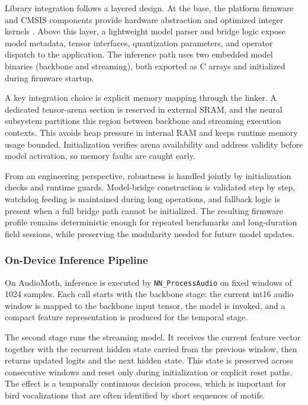 \documentclass[a4paper,singleside,12pt]{report} %
\begin{document}
		Library integration follows a layered design. At the base, the platform firmware and CMSIS components provide hardware abstraction and optimized integer kernels \cite{cmsisnn2018}. Above this layer, a lightweight model parser and bridge logic expose model metadata, tensor interfaces, quantization parameters, and operator dispatch to the application. The inference path uses two embedded model binaries (backbone and streaming), both exported as C arrays and initialized during firmware startup.

	A key integration choice is explicit memory mapping through the linker. A dedicated tensor-arena section is reserved in external SRAM, and the neural subsystem partitions this region between backbone and streaming execution contexts. This avoids heap pressure in internal RAM and keeps runtime memory usage bounded. Initialization verifies arena availability and address validity before model activation, so memory faults are caught early.

	From an engineering perspective, robustness is handled jointly by initialization checks and runtime guards. Model-bridge construction is validated step by step, watchdog feeding is maintained during long operations, and fallback logic is present when a full bridge path cannot be initialized. The resulting firmware profile remains deterministic enough for repeated benchmarks and long-duration field sessions, while preserving the modularity needed for future model updates.

\subsubsection{On-Device Inference Pipeline}
	On AudioMoth, inference is executed by \texttt{NN\_ProcessAudio} on fixed windows of 1024 samples. Each call starts with the backbone stage: the current int16 audio window is mapped to the backbone input tensor, the model is invoked, and a compact feature representation is produced for the temporal stage.

	The second stage runs the streaming model. It receives the current feature vector together with the recurrent hidden state carried from the previous window, then returns updated logits and the next hidden state. This state is preserved across consecutive windows and reset only during initialization or explicit reset paths. The effect is a temporally continuous decision process, which is important for bird vocalizations that are often identified by short sequences of motifs.
\end{document}

